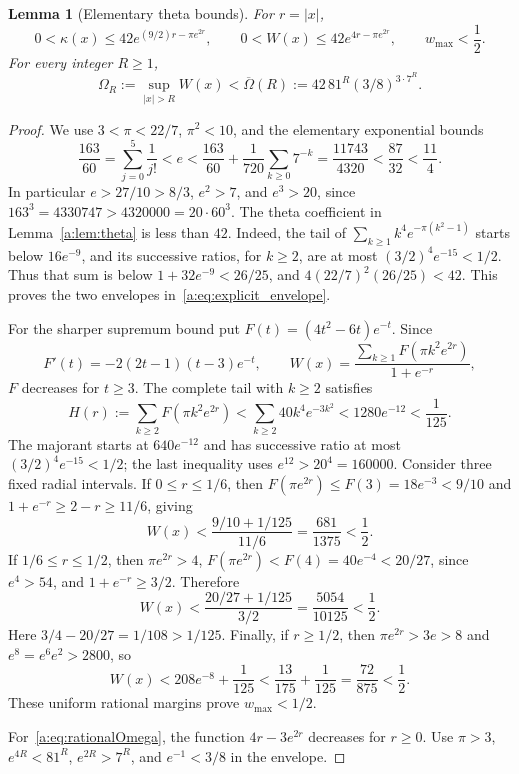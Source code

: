 \documentclass[11pt,a4paper]{article}
\numberwithin{equation}{section}
\newtheorem{lemma}[theorem]{Lemma}
\theoremstyle{definition}\newtheorem{definition}[theorem]{Definition}
\theoremstyle{remark}\newtheorem{remark}[theorem]{Remark}
\begin{document}
\begin{lemma}[Elementary theta bounds]\label{a:lem:explicitW}
For $r=|x|$,
\begin{equation}\label{a:eq:explicit_envelope}
 0<\kappa(x)\le42e^{(9/2)r-\pi e^{2r}},\qquad
 0<W(x)\le42e^{4r-\pi e^{2r}},\qquad w_{\max}<\frac12.
\end{equation}
For every integer $R\ge1$,
\begin{equation}\label{a:eq:rationalOmega}
 \Omega_R:=\sup_{|x|>R}W(x)
 <\overline\Omega(R):=42\,81^R(3/8)^{3\cdot7^R}.
\end{equation}
\end{lemma}
\begin{proof}
We use $3<\pi<22/7$, $\pi^2<10$, and the elementary exponential bounds
\begin{equation}\label{a:eq:elementarye}
 \frac{163}{60}=\sum_{j=0}^5\frac1{j!}<e
 <\frac{163}{60}+\frac1{720}\sum_{k\ge0}7^{-k}
 =\frac{11743}{4320}<\frac{87}{32}<\frac{11}{4}.
\end{equation}
In particular $e>27/10>8/3$, $e^2>7$, and $e^3>20$, since
$163^3=4330747>4320000=20\cdot60^3$.
The theta coefficient in Lemma~\ref{a:lem:theta} is less than $42$. Indeed, the tail of
$\sum_{k\ge1}k^4e^{-\pi(k^2-1)}$ starts below $16e^{-9}$, and its successive ratios, for $k\ge2$, are at most
$(3/2)^4e^{-15}<1/2$. Thus that sum is below
$1+32e^{-9}<26/25$, and
$4(22/7)^2(26/25)<42$.
This proves the two envelopes in~\eqref{a:eq:explicit_envelope}.

For the sharper supremum bound put $F(t)=(4t^2-6t)e^{-t}$. Since
\[
 F'(t)=-2(2t-1)(t-3)e^{-t},\qquad
 W(x)=\frac{\sum_{k\ge1}F(\pi k^2e^{2r})}{1+e^{-r}},
\]
$F$ decreases for $t\ge3$. The complete tail with $k\ge2$ satisfies
\[
 H(r):=\sum_{k\ge2}F(\pi k^2e^{2r})
 <\sum_{k\ge2}40k^4e^{-3k^2}<1280e^{-12}<\frac1{125}.
\]
The majorant starts at $640e^{-12}$ and has successive ratio at most
$(3/2)^4e^{-15}<1/2$; the last inequality uses $e^{12}>20^4=160000$.
Consider three fixed radial intervals. If $0\le r\le1/6$, then
$F(\pi e^{2r})\le F(3)=18e^{-3}<9/10$ and
$1+e^{-r}\ge2-r\ge11/6$, giving
\[
 W(x)<\frac{9/10+1/125}{11/6}=\frac{681}{1375}<\frac12.
\]
If $1/6\le r\le1/2$, then $\pi e^{2r}>4$,
$F(\pi e^{2r})<F(4)=40e^{-4}<20/27$, since $e^4>54$,
and $1+e^{-r}\ge3/2$. Therefore
\[
 W(x)<\frac{20/27+1/125}{3/2}=\frac{5054}{10125}<\frac12.
\]
Here $3/4-20/27=1/108>1/125$. Finally, if $r\ge1/2$, then
$\pi e^{2r}>3e>8$ and $e^8=e^6e^2>2800$, so
\[
 W(x)<208e^{-8}+\frac1{125}
 <\frac{13}{175}+\frac1{125}=\frac{72}{875}<\frac12.
\]
These uniform rational margins prove $w_{\max}<1/2$.

For~\eqref{a:eq:rationalOmega}, the function $4r-3e^{2r}$ decreases for $r\ge0$. Use $\pi>3$, $e^{4R}<81^R$, $e^{2R}>7^R$, and $e^{-1}<3/8$ in the envelope.
\end{proof}
\end{document}
